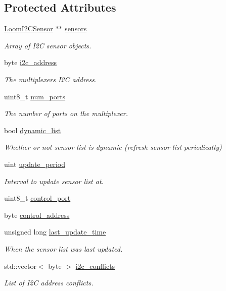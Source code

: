 \subsection*{Protected Attributes}
\begin{DoxyCompactItemize}
\item 
\hyperlink{class_loom_i2_c_sensor}{Loom\+I2\+C\+Sensor} $\ast$$\ast$ \hyperlink{class_loom___multiplexer_a1ca4e73888b5d46fef8c09997148a937}{sensors}
\begin{DoxyCompactList}\small\item\em Array of I2C sensor objects. \end{DoxyCompactList}\item 
byte \hyperlink{class_loom___multiplexer_af382145cee4e802bbf431e799983423b}{i2c\+\_\+address}
\begin{DoxyCompactList}\small\item\em The multiplexer\textquotesingle{}s I2C address. \end{DoxyCompactList}\item 
uint8\+\_\+t \hyperlink{class_loom___multiplexer_a444e58e98dd2ef120e2bb5a2e6befc45}{num\+\_\+ports}
\begin{DoxyCompactList}\small\item\em The number of ports on the multiplexer. \end{DoxyCompactList}\item 
bool \hyperlink{class_loom___multiplexer_a90202eb1f078d7448cf0b0763ddbcb3d}{dynamic\+\_\+list}
\begin{DoxyCompactList}\small\item\em Whether or not sensor list is dynamic (refresh sensor list periodically) \end{DoxyCompactList}\item 
uint \hyperlink{class_loom___multiplexer_a34d6b989ed4a1b5059fd28c277f9b0c9}{update\+\_\+period}
\begin{DoxyCompactList}\small\item\em Interval to update sensor list at. \end{DoxyCompactList}\item 
uint8\+\_\+t \hyperlink{class_loom___multiplexer_a0b5eae9f338d70f873c04a5c46f6556c}{control\+\_\+port}
\item 
byte \hyperlink{class_loom___multiplexer_a56aa8b81fecbab9d25c7c9fb0e607908}{control\+\_\+address}
\item 
unsigned long \hyperlink{class_loom___multiplexer_a2e924abfa8444f66dc1b9cdf3a3aad47}{last\+\_\+update\+\_\+time}
\begin{DoxyCompactList}\small\item\em When the sensor list was last updated. \end{DoxyCompactList}\item 
std\+::vector$<$ byte $>$ \hyperlink{class_loom___multiplexer_ab30823612eef6bb3fcd2fc023bc425b3}{i2c\+\_\+conflicts}
\begin{DoxyCompactList}\small\item\em List of I2C address conflicts. \end{DoxyCompactList}\end{DoxyCompactItemize}
